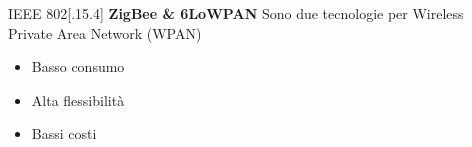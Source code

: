 
\begin{frame}{IEEE 802[.15.4]}
\textbf{ZigBee \& 6LoWPAN}
	\newline
	Sono due tecnologie per Wireless Private Area Network (WPAN)
	\begin{itemize}[<+- | alert@+>]
		\item Basso consumo
		\item Alta flessibilità
		\item Bassi costi
	\end{itemize}
\end{frame}

